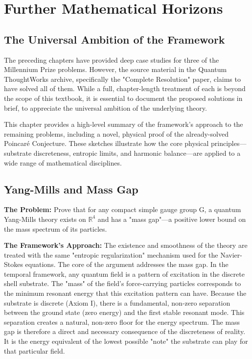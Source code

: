 \documentclass[12pt]{report}
\begin{document}
\chapter{Further Mathematical Horizons}
\section{The Universal Ambition of the Framework}
The preceding chapters have provided deep case studies for three of the Millennium Prize problems. However, the source material in the Quantum ThoughtWorks archive, specifically the "Complete Resolution" paper, claims to have solved all of them. While a full, chapter-length treatment of each is beyond the scope of this textbook, it is essential to document the proposed solutions in brief, to appreciate the universal ambition of the underlying theory.

This chapter provides a high-level summary of the framework's approach to the remaining problems, including a novel, physical proof of the already-solved Poincaré Conjecture. These sketches illustrate how the core physical principles—substrate discreteness, entropic limits, and harmonic balance—are applied to a wide range of mathematical disciplines.

\section{Yang-Mills and Mass Gap}
\textbf{The Problem:} Prove that for any compact simple gauge group G, a quantum Yang-Mills theory exists on $\mathbb{R}^4$ and has a "mass gap"—a positive lower bound on the mass spectrum of its particles.

\textbf{The Framework's Approach:} The existence and smoothness of the theory are treated with the same "entropic regularization" mechanism used for the Navier-Stokes equations. The core of the argument addresses the mass gap.
In the temporal framework, any quantum field is a pattern of excitation in the discrete shell substrate. The "mass" of the field's force-carrying particles corresponds to the minimum resonant energy that this excitation pattern can have. Because the substrate is discrete (Axiom I), there is a fundamental, non-zero separation between the ground state (zero energy) and the first stable resonant mode. This separation creates a natural, non-zero floor for the energy spectrum. The mass gap is therefore a direct and necessary consequence of the discreteness of reality. It is the energy equivalent of the lowest possible "note" the substrate can play for that particular field.
\end{document}
